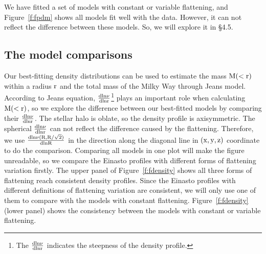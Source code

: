 \documentclass[12pt,preprint]{aastex}
\begin{document}
We have fitted a set of models with constant or variable flattening, and Figure~\ref{f:fpdm} shows all models fit well with the data. However, it can not reflect the difference between these models. So, we will explore it in \S 4.5.
\subsection{The model comparisons}
Our best-fitting density distributions can be used to estimate the mass $\rm M(<r)$ within a radius $\rm r$ and the total mass of the Milky Way through Jeans model. According to Jeans equation, $\rm \frac{dln\nu}{dlnr}$\footnote{The $\rm \frac{dln\nu}{dlnr}$ indicates the steepness of the density profile.} plays an important role when calculating $\rm M(<r)$, so we explore the difference between our best-fitted models by comparing their $\rm \frac{dln\nu}{dlnr}$. The stellar halo is oblate, so the density profile is axisymmetric. The spherical $\rm \frac{dln\nu}{dlnr}$ can not reflect the difference caused by the flattening. Therefore, we use $\rm \frac{dln\nu(R,R/\sqrt{2})}{dlnR}$ in the direction along the diagonal line in $\rm (x,y,z)$ coordinate to do the comparison. Comparing all models in one plot will make the figure unreadable, so we compare the Einasto profiles with different forms of flattening variation firstly. The upper panel of Figure~\ref{f:fdensity} shows all three forms of flattening reach consistent density profiles. Since the Einasto profiles with different definitions of flattening variation are consistent, we will only use one of them to compare with the models with constant flattening. Figure~\ref{f:fdensity} (lower panel) shows the consistency between the models with constant or variable flattening.
\end{document}
